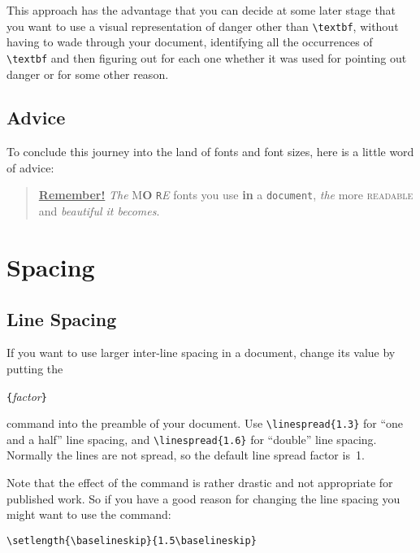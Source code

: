This approach has the advantage that you can decide at some later
stage that you want to use a visual representation of danger other
than \verb|\textbf|, without having to wade through your document,
identifying all the occurrences of \verb|\textbf| and then figuring out
for each one whether it was used for pointing out danger or for some other
reason.


\subsection{Advice}

To conclude this journey into the land of fonts and font sizes,
here is a little word of advice:\nopagebreak

\begin{quote}
  \underline{\textbf{Remember\Huge!}} \textit{The}
  \textsf{M\textbf{\LARGE O} \texttt{R}\textsl{E}} fonts \Huge you
  \tiny use \footnotesize \textbf{in} a \small \texttt{document},
  \large \textit{the} \normalsize more \textsc{readable} and
  \textsl{\textsf{beautiful} it bec\large o\Large m\LARGE e\huge s}.
\end{quote}

\section{Spacing}
 
\subsection{Line Spacing}

 If you want to use larger inter-line spacing in a
document, change its value by putting the
\begin{lscommand}
\verb|{|\emph{factor}\verb|}|
\end{lscommand}
\noindent command into the preamble of your document.
Use \verb|\linespread{1.3}| for ``one and a half'' line
spacing, and \verb|\linespread{1.6}| for ``double'' line spacing.  Normally
the lines are not spread, so the default line spread factor
is~1.

Note that the effect of the  command is rather drastic and     
not appropriate for published work. So if you have a good reason for
changing the line spacing you might want to use the command:
\begin{lscommand}
\verb|\setlength{\baselineskip}{1.5\baselineskip}|
\end{lscommand}

